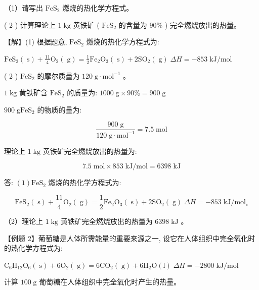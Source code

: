 \documentclass[10pt]{article}
\begin{document}
（1）请写出 \({\mathrm{{FeS}}}_{2}\) 燃烧的热化学方程式。

( 2 ) 计算理论上 \(1\mathrm{\;{kg}}\) 黄铁矿 ( \({\mathrm{{FeS}}}_{2}\) 的含量为 \({90}\%\) ) 完全燃烧放出的热量。

【解】(1) 根据题意, \({\mathrm{{FeS}}}_{2}\) 燃烧的热化学方程式为:

\({\mathrm{{FeS}}}_{2}\left( \mathrm{\;s}\right) + \frac{11}{4}{\mathrm{O}}_{2}\left( \mathrm{\;g}\right) = \frac{1}{2}{\mathrm{{Fe}}}_{2}{\mathrm{O}}_{3}\left( \mathrm{\;s}\right) + 2{\mathrm{{SO}}}_{2}\left( \mathrm{\;g}\right) \;{\Delta H} = - {853}\mathrm{\;{kJ}}/\mathrm{{mol}}\)

( 2 ) \({\mathrm{{FeS}}}_{2}\) 的摩尔质量为 \({120}\mathrm{\;g} \cdot {\mathrm{{mol}}}^{-1}\) 。

\(1\mathrm{\;{kg}}\) 黄铁矿含 \({\mathrm{{FeS}}}_{2}\) 的质量为: \({1000}\mathrm{\;g} \times {90}\% = {900}\mathrm{\;g}\)

\({900}\mathrm{\;g}{\mathrm{{FeS}}}_{2}\) 的物质的量为:

\[
\frac{{900}\mathrm{\;g}}{{120}\mathrm{\;g} \cdot {\mathrm{{mol}}}^{-1}} = {7.5}\mathrm{\;{mol}}
\]

理论上 \(1\mathrm{\;{kg}}\) 黄铁矿完全燃烧放出的热量为:

\[
{7.5}\mathrm{\;{mol}} \times {853}\mathrm{\;{kJ}}/\mathrm{{mol}} = {6398}\mathrm{\;{kJ}}
\]

答: \(\left( 1\right) {\mathrm{{FeS}}}_{2}\) 燃烧的热化学方程式为:

\[
{\mathrm{{FeS}}}_{2}\left( \mathrm{\;s}\right) + \frac{11}{4}{\mathrm{O}}_{2}\left( \mathrm{\;g}\right) = \frac{1}{2}{\mathrm{{Fe}}}_{2}{\mathrm{O}}_{3}\left( \mathrm{\;s}\right) + 2{\mathrm{{SO}}}_{2}\left( \mathrm{\;g}\right) \;{\Delta H} = - {853}\mathrm{\;{kJ}}/{\mathrm{{mol}}}_{ \circ }
\]

（2）理论上 \(1\mathrm{\;{kg}}\) 黄铁矿完全燃烧放出的热量为 \({6398}\mathrm{\;{kJ}}\) 。

【例题 2】葡萄糖是人体所需能量的重要来源之一, 设它在人体组织中完全氧化时的热化学方程式为:

\({\mathrm{C}}_{6}{\mathrm{H}}_{12}{\mathrm{O}}_{6}\left( \mathrm{\;s}\right) + 6{\mathrm{O}}_{2}\left( \mathrm{\;g}\right) = 6{\mathrm{{CO}}}_{2}\left( \mathrm{\;g}\right) + 6{\mathrm{H}}_{2}\mathrm{O}\left( \mathrm{l}\right) \;{\Delta H} = - {2800}\mathrm{\;{kJ}}/\mathrm{{mol}}\)

计算 \({100}\mathrm{\;g}\) 葡萄糖在人体组织中完全氧化时产生的热量。
\end{document}
